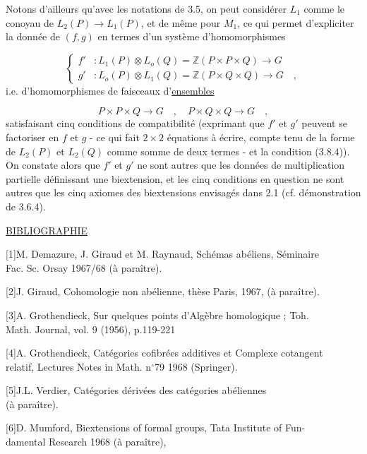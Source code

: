 Notons d'ailleurs qu'avec les notations de 3.5, on peut considérer $L_1$ comme le conoyau de $L_2(P) \longrightarrow L_1(P)$, et de même pour $M_1$, ce qui permet d'expliciter la donnée de $(f,g)$ en termes d'un système d'homomorphismes

\begin{equation*}
\left\{
\begin{aligned}
f' &: L_1(P) \otimes L_o(Q) = \mathbb{Z}(P\times P\times Q) \longrightarrow G\\
g' &: L_o(P) \otimes L_1(Q) = \mathbb{Z}(P\times Q\times Q) \longrightarrow G \quad ,
\end{aligned}
\right.
\end{equation*}
i.e. d'homomorphismes de faisceaux d'\underline{ensembles}

\begin{equation*}
P\times P\times Q \longrightarrow G \quad , \quad P\times Q\times Q \longrightarrow G \quad ,
\end{equation*}
satisfaisant cinq conditions de compatibilité (exprimant que $f'$ et $g'$ peuvent se factoriser en $f$ et $g$ - ce qui fait $2\times 2$ équations à écrire, compte tenu de la forme de $L_2(P)$ et $L_2(Q)$ comme somme de deux termes - et la condition (3.8.4)). On constate alors que $f'$ et $g'$ ne sont autres que les données de multiplication partielle définissant une biextension, et les cinq conditions en question ne sont autres que les cinq axiomes des biextensions envisagés dans 2.1 (cf. démonstration de 3.6.4).




\underline{BIBLIOGRAPHIE}

{[1]}\quad M. Demazure, J. Giraud et M. Raynaud, Schémas abéliens, Séminaire \\
\hspace*{4em}Fac. Sc. Orsay 1967/68 (à paraître).

{[2]}\quad J. Giraud, Cohomologie non abélienne, thèse Paris, 1967, (à paraître).

{[3]}\quad A. Grothendieck, Sur quelques points d'Algèbre homologique ; Toh. \\
\hspace*{4em}Math. Journal, vol. 9 (1956), p.119-221

{[4]}\quad A. Grothendieck, Catégories cofibrées additives et Complexe cotangent \\
\hspace*{4em}relatif, Lectures Notes in Math. n$^{\circ}$79 1968 (Springer).

{[5]}\quad J.L. Verdier, Catégories dérivées des catégories abéliennes \\
\hspace*{4em}(à paraître).

{[6]}\quad D. Mumford, Biextensions of formal groups, Tata Institute of Fun- \\
\hspace*{4em}damental Research 1968 (à paraître),
